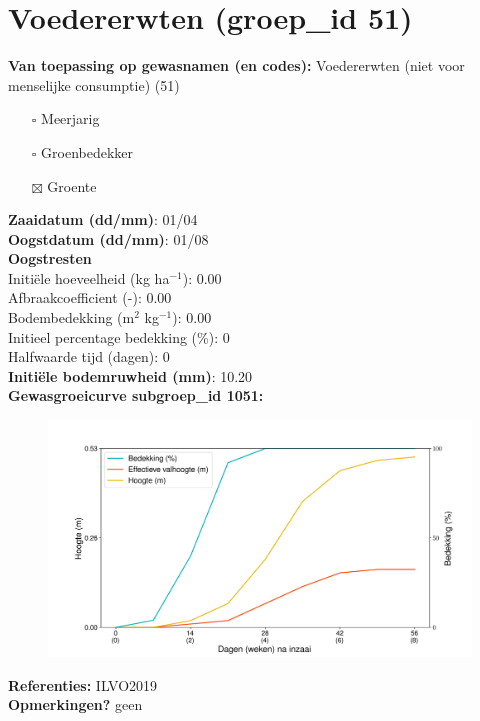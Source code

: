\documentclass{article}
\begin{document}
 \section{Voedererwten (groep\_id 51)} 
 \textbf{Van toepassing op gewasnamen (en codes):} Voedererwten (niet voor menselijke consumptie) (51) 
 \begin{multicols}{3} \begin{itemize} \item[$\square$] Meerjarig \item[$\square$] Groenbedekker \item[$\boxtimes$] Groente \end{itemize} \end{multicols} 
  \textbf{Zaaidatum (dd/mm)}: 01/04  \vspace{0.10cm} \\ 
  \textbf{Oogstdatum (dd/mm)}: 01/08  \vspace{0.10cm} \\ 
  \textbf{Oogstresten} \vspace{0.05cm} \\ 
  \tab Initi\"{e}le hoeveelheid (kg ha$^{-1}$): 0.00 \vspace{0.05cm} \\ 
  \tab Afbraakcoefficient (-): 0.00 \vspace{0.05cm} \\ 
  \tab Bodembedekking (m$^2$ kg$^{-1}$): 0.00 \vspace{0.05cm} \\ 
  \tab Initieel percentage bedekking (\%): 0 \vspace{0.05cm} \\ 
  \tab Halfwaarde tijd (dagen): 0 \vspace{0.05cm} \\ 
  \textbf{Initi\"{e}le bodemruwheid (mm)}: 10.20 \vspace{0.05cm} \\ 
  \textbf{Gewasgroeicurve subgroep\_id 1051:} 
 \begin{center} \begin{figure}[H] \includegraphics[width=12.5cm]{temp/1051.png} \end{figure} \end{center} 
  \textbf{Referenties:} ILVO2019 \vspace{0.10cm} \\ 
  \textbf{Opmerkingen?} geen \vspace{0.10cm} \\ 
 \newpage 
\end{document}
